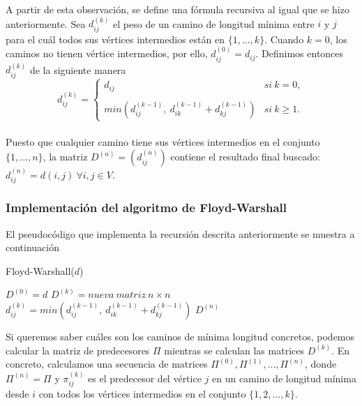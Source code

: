A partir de esta observación, se define una fórmula recursiva al igual que se hizo anteriormente. Sea $d_{ij}^{(k)}$ el peso de un camino de longitud mínima entre $i$ y $j$ para el cuál todos sus vértices intermedios están en $\{1,...,k\}$. Cuando $k=0$, los caminos no tienen vértice intermedios, por ello, $d_{ij}^{(0)}=d_{ij}$. Definimos entonces $d_{ij}^{(k)}$ de la siguiente manera \\

$$d_{ij}^{(k)}= \left\{ \begin{array}{lcc}
	d_{ij} &   si\ k=0, \\
	\\ min(d_{ij}^{(k-1)},\ d_{ik}^{(k-1)}+d_{kj}^{(k-1)}) & si\ k\geq 1.
\end{array}
\right.$$ \\

Puesto que cualquier camino tiene sus vértices intermedios en el conjunto $\{1,...,n\}$, la matriz $D^{(n)}=(d_{ij}^{(n)})$ contiene el resultado final buscado: $d_{ij}^{(n)}=d(i,j)\ \forall i,j\in V.$

\subsubsection{Implementación del algoritmo de Floyd-Warshall}

El pseudocódigo que implementa la recursión descrita anteriormente se muestra a continuación

\begin{breakablealgorithm}
	\caption{Floyd-Warshall($d$)}
	\begin{algorithmic}[1]
		\State $D^{(0)}=d$
			\State $D^{(k)}=nueva\ matriz\ n\times n$
					\State $d_{ij}^{(k)}=min(d_{ij}^{(k-1)},\ d_{ik}^{(k-1)}+d_{kj}^{(k-1)})$
				\EndFor
			\EndFor
		\EndFor
		\Return $D^{(n)}$
	\end{algorithmic}
\end{breakablealgorithm}

Si queremos saber cuáles son los caminos de mínima longitud concretos, podemos calcular la matriz de predecesores $\Pi$ mientras se calculan las matrices $D^{(k)}$. En concreto, calculamos una secuencia de matrices $\Pi^{(0)},\Pi^{(1)},...,\Pi^{(n)}$, donde $\Pi^{(n)}=\Pi$ y $\pi_{ij}^{(k)}$ es el predecesor del vértice $j$ en un camino de longitud mínima desde $i$ con todos los vértices intermedios en el conjunto $\{1,2,...,k\}$. \\


